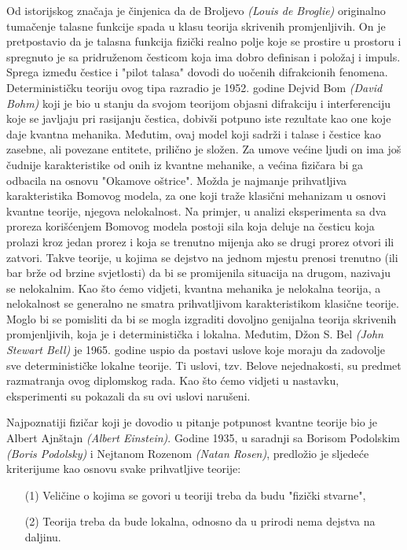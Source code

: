 Od istorijskog značaja je činjenica da de Broljevo {\it{(Louis de Broglie)}} originalno
tumačenje talasne funkcije spada u klasu teorija skrivenih promjenljivih. On je
pretpostavio da je talasna funkcija fizički realno polje koje se prostire u prostoru
i spregnuto je sa pridruženom česticom koja ima dobro definisan i položaj i impuls.
Sprega između čestice i "pilot talasa" dovodi do uočenih difrakcionih fenomena.
Determinističku teoriju ovog tipa razradio je 1952. godine Dejvid Bom {\it{(David Bohm)}}
koji je bio u stanju da svojom teorijom objasni difrakciju i interferenciju koje se
javljaju pri rasijanju čestica, dobivši potpuno iste rezultate kao one koje daje
kvantna mehanika. Međutim, ovaj model koji sadrži i talase i čestice kao zasebne,
ali povezane entitete, prilično je složen. Za umove većine ljudi on ima još čudnije
karakteristike od onih iz kvantne mehanike, a većina fizičara bi ga odbacila na
osnovu "Okamove oštrice". Možda je najmanje prihvatljiva karakteristika Bomovog
modela, za one koji traže klasični mehanizam u osnovi kvantne teorije, njegova
nelokalnost. Na primjer, u analizi eksperimenta sa dva proreza korišćenjem Bomovog
modela postoji sila koja deluje na česticu koja prolazi kroz jedan prorez i koja se
trenutno mijenja ako se drugi prorez otvori ili zatvori. Takve teorije, u kojima se dejstvo na jednom mjestu prenosi trenutno (ili bar brže od brzine svjetlosti) da bi se
promijenila situacija na drugom, nazivaju se nelokalnim. Kao što ćemo vidjeti, kvantna
mehanika je nelokalna teorija, a nelokalnost se generalno ne smatra prihvatljivom
karakteristikom klasične teorije. Moglo bi se pomisliti da bi se mogla izgraditi
dovoljno genijalna teorija skrivenih promjenljivih, koja je i deterministička i
lokalna. Međutim, Džon S. Bel {\it{(John Stewart Bell)}} je 1965. godine uspio da postavi
uslove koje moraju da zadovolje sve determinističke lokalne teorije.
Ti uslovi, tzv. Belove nejednakosti, su predmet razmatranja ovog diplomskog rada.
Kao što ćemo
vidjeti u nastavku, eksperimenti su pokazali da su ovi uslovi narušeni.

Najpoznatiji fizičar koji je dovodio u pitanje potpunost kvantne teorije bio je
Albert Ajnštajn {\it{(Albert Einstein)}}. Godine 1935, u saradnji sa Borisom Podolskim {\it{(Boris Podolsky)}} i Nejtanom Rozenom
{\it{(Natan Rosen)}}, predložio je sljedeće kriterijume
kao osnovu svake prihvatljive teorije:

\begin{enumerate}
    \item[(1)] Veličine o kojima se govori u teoriji treba da budu "fizički stvarne",
    \item[(2)] Teorija treba da bude lokalna, odnosno da u prirodi nema dejstva na daljinu.
\end{enumerate}

